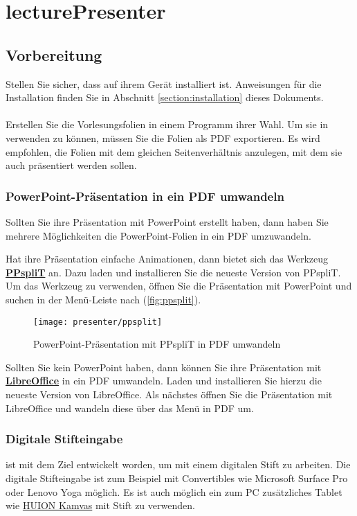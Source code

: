 \chapter{lecturePresenter}

\section{Vorbereitung}
Stellen Sie sicher, dass \lectStudio{} auf ihrem Gerät installiert ist. Anweisungen für die Installation finden Sie in Abschnitt \ref{section:installation} dieses Dokuments.
\\\\
Erstellen Sie die Vorlesungsfolien in einem Programm ihrer Wahl. Um sie in \lectStudio{} verwenden zu können, müssen Sie die Folien als PDF exportieren. Es wird empfohlen, die Folien mit dem gleichen Seitenverhältnis anzulegen, mit dem sie auch präsentiert werden sollen.

\subsection*{PowerPoint-Präsentation in ein PDF umwandeln}
Sollten Sie ihre Präsentation mit PowerPoint erstellt haben, dann haben Sie mehrere Möglichkeiten die PowerPoint-Folien in ein PDF umzuwandeln.

Hat ihre Präsentation einfache Animationen, dann bietet sich das Werkzeug \textbf{\href{http://www.maxonthenet.altervista.org/ppsplit.php}{PPspliT}} an. Dazu laden und installieren Sie die neueste Version von PPspliT. Um das Werkzeug zu verwenden, öffnen Sie die Präsentation mit PowerPoint und suchen in der Menü-Leiste nach  (\autoref{fig:ppsplit}).

\begin{figure}[H]
	\centering
	\texttt{[image: presenter/ppsplit]}
	\caption{PowerPoint-Präsentation mit PPspliT in PDF umwandeln}
	\label{fig:ppsplit}
\end{figure}

Sollten Sie kein PowerPoint haben, dann können Sie ihre Präsentation mit \textbf{\href{https://de.libreoffice.org/download/download/}{LibreOffice}} in ein PDF umwandeln. Laden und installieren Sie hierzu die neueste Version von LibreOffice. Als nächstes öffnen Sie die Präsentation mit LibreOffice und wandeln diese über das Menü  in PDF um.


\subsection*{Digitale Stifteingabe}
\lectPresenter{} ist mit dem Ziel entwickelt worden, um mit einem digitalen Stift zu arbeiten. Die digitale Stifteingabe ist zum Beispiel mit Convertibles wie Microsoft Surface Pro oder Lenovo Yoga möglich. Es ist auch möglich ein zum PC zusätzliches Tablet wie \href{https://www.huion.com/pen_display}{HUION Kamvas} mit Stift zu verwenden.


